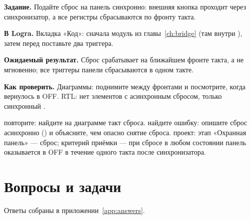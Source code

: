 \begin{diybox}
\textbf{Задание.} Подайте сброс на панель синхронно: внешняя кнопка проходит через синхронизатор, а все регистры сбрасываются по фронту такта.

\textbf{В Logra.} Вкладка «Код»: сначала модуль  из главы~\ref{ch:bridge} (там  внутри ), затем перед  поставьте два триггера.

\textbf{Ожидаемый результат.} Сброс срабатывает на ближайшем фронте такта, а не мгновенно; все триггеры панели сбрасываются в одном такте.

\textbf{Как проверить.} Диаграммы: поднимите  между фронтами и посмотрите, когда  вернулось в OFF. RTL: нет элементов с асинхронным сбросом, только синхронный .

 повторите: найдите на диаграмме такт сброса.  найдите ошибку: опишите сброс асинхронно () и объясните, чем опасно снятие сброса.  проект: этап «Охранная панель» --- сброс; критерий приёмки --- при сбросе в любом состоянии панель оказывается в OFF в течение одного такта после синхронизатора.
\end{diybox}

\section{Вопросы и задачи}
\label{sec:tasks-clocks}

Ответы собраны в приложении~\ref{app:answers}.

